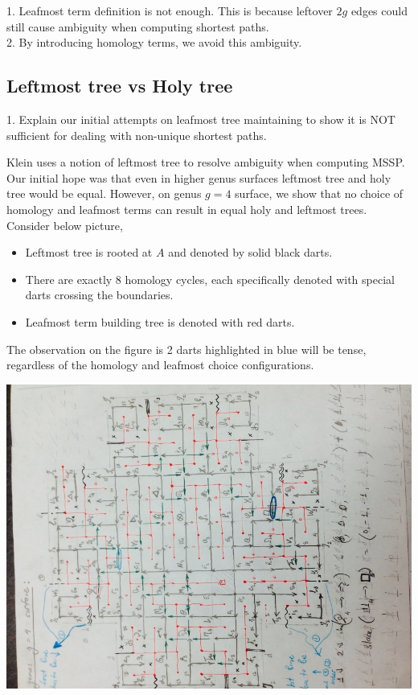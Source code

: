 \documentclass{article}
\begin{document}
\begin{center}
{\color{red}
1. Leafmost term definition is not enough. This is because leftover $2g$ edges
could still cause ambiguity when computing shortest paths. \\
2. By introducing homology terms, we avoid this ambiguity.}
\end{center}

\subsection{Leftmost tree vs Holy tree}
\begin{center}
{\color{red}
1. Explain our initial attempts on leafmost tree maintaining to show it is NOT
sufficient for dealing with non-unique shortest paths.}
\end{center}

Klein \cite{klein2005multiple} uses a notion of leftmost tree to resolve ambiguity when 
computing MSSP.
Our initial hope was that even in higher genus surfaces leftmost tree and holy
tree would be equal. However, on genus $g = 4$ surface, we show that no
choice of homology and leafmost terms can result in equal holy and
leftmost trees. Consider below picture, \\
\begin{itemize}
\item Leftmost tree is rooted at $A$ and denoted by solid black darts.
\item There are exactly 8 homology cycles, each specifically denoted with
special darts crossing the boundaries.
\item Leafmost term building tree is denoted with red darts.
\end{itemize}
The observation on the figure is 2 darts highlighted in blue will be tense, 
regardless of the homology and leafmost choice configurations.
\begin{center}
\includegraphics[angle = -90, scale = 0.7]{figures/Genus4_InitialHolyTree.jpg}
\end{center}
\end{document}
